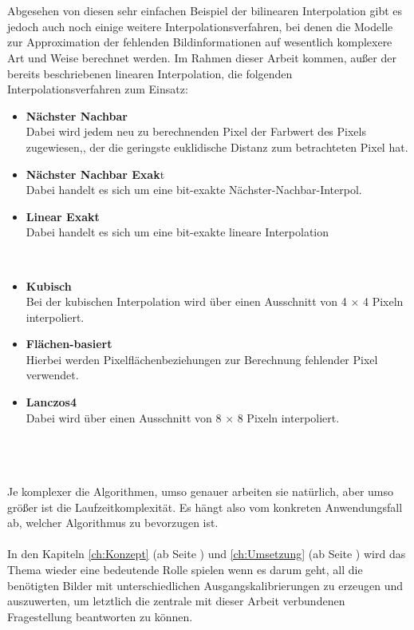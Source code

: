 \documentclass[
fontsize=10pt, 
listof = totoc,
parskip = half	
]{report}
\begin{document}
\\\\
\noindent Abgesehen von diesen sehr einfachen Beispiel der bilinearen Interpolation gibt es jedoch auch noch einige weitere Interpolationsverfahren, bei denen die Modelle zur Approximation der fehlenden Bildinformationen auf wesentlich komplexere Art und Weise berechnet werden. Im Rahmen dieser Arbeit kommen, außer der bereits beschriebenen linearen Interpolation, die folgenden Interpolationsverfahren zum Einsatz:
\begin{minipage}[t]{0.45\linewidth}\vspace{0pt}
	\begin{itemize}
		\item \textbf{Nächster Nachbar}\\
		Dabei wird jedem neu zu berechnenden Pixel der Farbwert des Pixels zugewiesen,, der die geringste euklidische Distanz zum betrachteten Pixel hat.  
		\item \textbf{Nächster Nachbar Exak}t\\
		Dabei handelt es sich um eine bit-exakte Nächster-Nachbar-Interpol.
		\item \textbf{Linear Exakt}\\
		Dabei handelt es sich um eine bit-exakte lineare Interpolation
	\end{itemize}
\end{minipage}~~~~
\begin{minipage}[t]{0.45\linewidth}\vspace{0pt}
	\begin{itemize}
		\item \textbf{Kubisch}\\
		Bei der kubischen Interpolation wird über einen Ausschnitt von 4 $\times$ 4 Pixeln interpoliert.
		\item \textbf{Flächen-basiert}\\
		Hierbei werden Pixelflächenbeziehungen zur Berechnung fehlender Pixel verwendet.
		\item \textbf{Lanczos4}\\
		Dabei wird über einen Ausschnitt von 8 $\times$ 8 Pixeln interpoliert.
	\end{itemize}
\end{minipage}
\\\\\\
\noindent Je komplexer die Algorithmen, umso genauer arbeiten sie natürlich, aber umso größer ist die Laufzeitkomplexität. Es hängt also vom konkreten Anwendungsfall ab, welcher Algorithmus zu bevorzugen ist.
\\\\
\noindent In den Kapiteln \ref{ch:Konzept} (ab Seite \pageref{ch:Konzept}) und \ref{ch:Umsetzung} (ab Seite \pageref{ch:Umsetzung}) wird das Thema wieder eine bedeutende Rolle spielen wenn es darum geht, all die benötigten Bilder mit unterschiedlichen Ausgangskalibrierungen zu erzeugen und auszuwerten, um letztlich die zentrale mit dieser Arbeit verbundenen Fragestellung beantworten zu können.
\end{document}
